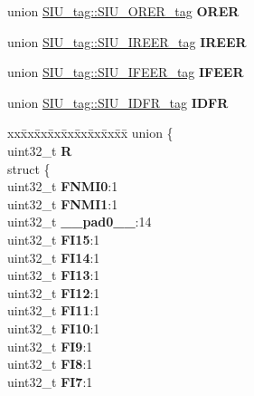 \begin{DoxyCompactItemize}
\begin{tabbing}
\end{tabbing}\item 
\mbox{\label{structSIU__tag_a45db207a73385b026ce4417e501727fa}} 
union \mbox{\hyperlink{unionSIU__tag_1_1SIU__ORER__tag}{S\+I\+U\+\_\+tag\+::\+S\+I\+U\+\_\+\+O\+R\+E\+R\+\_\+tag}} {\bfseries O\+R\+ER}
\item 
\mbox{\label{structSIU__tag_ab8844804880d8bd935eaf7c56e74cfe7}} 
union \mbox{\hyperlink{unionSIU__tag_1_1SIU__IREER__tag}{S\+I\+U\+\_\+tag\+::\+S\+I\+U\+\_\+\+I\+R\+E\+E\+R\+\_\+tag}} {\bfseries I\+R\+E\+ER}
\item 
\mbox{\label{structSIU__tag_a61b52706e08961ac939e0fe8b2a6f282}} 
union \mbox{\hyperlink{unionSIU__tag_1_1SIU__IFEER__tag}{S\+I\+U\+\_\+tag\+::\+S\+I\+U\+\_\+\+I\+F\+E\+E\+R\+\_\+tag}} {\bfseries I\+F\+E\+ER}
\item 
\mbox{\label{structSIU__tag_a981095287b54004036dfe09edbbcd16a}} 
union \mbox{\hyperlink{unionSIU__tag_1_1SIU__IDFR__tag}{S\+I\+U\+\_\+tag\+::\+S\+I\+U\+\_\+\+I\+D\+F\+R\+\_\+tag}} {\bfseries I\+D\+FR}
\item 
\mbox{\label{structSIU__tag_af31d319c739448a2a4b10bff20ede393}} 
\begin{tabbing}
xx\=xx\=xx\=xx\=xx\=xx\=xx\=xx\=xx\=\kill
union \{\\
\>uint32\_t {\bfseries R}\\
\>struct \{\\
\>\>uint32\_t {\bfseries FNMI0}:1\\
\>\>uint32\_t {\bfseries FNMI1}:1\\
\>\>uint32\_t {\bfseries \_\_pad0\_\_}:14\\
\>\>uint32\_t {\bfseries FI15}:1\\
\>\>uint32\_t {\bfseries FI14}:1\\
\>\>uint32\_t {\bfseries FI13}:1\\
\>\>uint32\_t {\bfseries FI12}:1\\
\>\>uint32\_t {\bfseries FI11}:1\\
\>\>uint32\_t {\bfseries FI10}:1\\
\>\>uint32\_t {\bfseries FI9}:1\\
\>\>uint32\_t {\bfseries FI8}:1\\
\>\>uint32\_t {\bfseries FI7}:1\\

\end{tabbing}
\end{DoxyCompactItemize}
